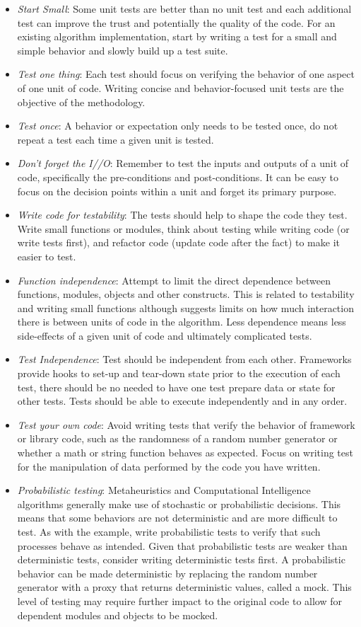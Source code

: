 \begin{itemize}
 	\item \emph{Start Small}: Some unit tests are better than no unit test and each additional test can improve the trust and potentially the quality of the code. For an existing algorithm implementation, start by writing a test for a small and simple behavior and slowly build up a test suite.
  \item \emph{Test one thing}: Each test should focus on verifying the behavior of one aspect of one unit of code. Writing concise and behavior-focused unit tests are the objective of the methodology.
  \item \emph{Test once}: A behavior or expectation only needs to be tested once, do not repeat a test each time a given unit is tested.
  \item \emph{Don't forget the I//O}: Remember to test the inputs and outputs of a unit of code, specifically the pre-conditions and post-conditions. It can be easy to focus on the decision points within a unit and forget its primary purpose.
	\item \emph{Write code for testability}: The tests should help to shape the code they test. Write small functions or modules, think about testing while writing code (or write tests first), and refactor code (update code after the fact) to make it easier to test.
	\item \emph{Function independence}: Attempt to limit the direct dependence between functions, modules, objects and other constructs. This is related to testability and writing small functions although suggests limits on how much interaction there is between units of code in the algorithm. Less dependence means less side-effects of a given unit of code and ultimately complicated tests.
  \item \emph{Test Independence}: Test should be independent from each other. Frameworks provide hooks to set-up and tear-down state prior to the execution of each test, there should be no needed to have one test prepare data or state for other tests. Tests should be able to execute independently and in any order.
	\item \emph{Test your own code}: Avoid writing tests that verify the behavior of framework or library code, such as the randomness of a random number generator or whether a math or string function behaves as expected. Focus on writing test for the manipulation of data performed by the code you have written.
	\item \emph{Probabilistic testing}: Metaheuristics and Computational Intelligence algorithms generally make use of stochastic or probabilistic decisions. This means that some behaviors are not deterministic and are more difficult to test. As with the example, write probabilistic tests to verify that such processes behave as intended. Given that probabilistic tests are weaker than deterministic tests, consider writing deterministic tests first. A probabilistic behavior can be made deterministic by replacing the random number generator with a proxy that returns deterministic values, called a mock. This level of testing may require further impact to the original code to allow for dependent modules and objects to be mocked.

\end{itemize}
